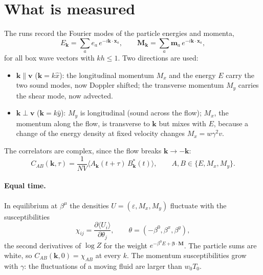 \documentclass[11pt,aps,preprint,nofootinbib,superscriptaddress,tightenlines]{revtex4-2}
\def\st{\begin{equation}}
\def\stp{\end{equation}}
\newcommand{\avg}[1]{\langle #1\rangle}
\let\oldparagraph\paragraph
\renewcommand{\paragraph}{\par\bigskip\oldparagraph}
\begin{document}
\section{What is measured}
\label{sec:measure}

The runs record the Fourier modes of the particle energies and momenta,
\st
E_{\bm k}=\sum_ae_a\,e^{-i\bm k\cdot\bm x_a},\qquad
\bm M_{\bm k}=\sum_a\bm m_a\,e^{-i\bm k\cdot\bm x_a},
\stp
for all box wave vectors with $kh\le1$.  Two directions are used:
\begin{itemize}
\item $\bm k\parallel\bm v$ ($\bm k=k\hat x$): the longitudinal momentum $M_x$ and the energy $E$
  carry the two sound modes, now Doppler shifted; the transverse momentum $M_y$ carries the
  shear mode, now advected.
\item $\bm k\perp\bm v$ ($\bm k=k\hat y$): $M_y$ is longitudinal (sound across the flow); $M_x$,
  the momentum along the flow, is transverse to $\bm k$ but mixes with $E$, because a change of
  the energy density at fixed velocity changes $M_x=w\gamma^2v$.
\end{itemize}
The correlators are complex, since the flow breaks $\bm k\to-\bm k$:
\st
C_{AB}(\bm k,\tau)=\frac{1}{NV}\avg{A_{\bm k}(t+\tau)\,B_{\bm k}^*(t)},\qquad A,B\in\{E,M_x,M_y\}.
\stp

\paragraph{Equal time.}  In equilibrium at $\beta^\mu$ the densities $U=(\varepsilon,M_x,M_y)$
fluctuate with the susceptibilities
\st
\chi_{ij}=\frac{\partial\avg{U_i}}{\partial\theta_j},\qquad
\theta=(-\beta^0,\beta^x,\beta^y),
\label{chi}
\stp
the second derivatives of $\log Z$ for the weight $e^{-\beta^0E+\bm\beta\cdot\bm M}$.  The particle
sums are white, so $C_{AB}(\bm k,0)=\chi_{AB}$ at every $k$.  The momentum susceptibilities grow
with $\gamma$: the fluctuations of a moving fluid are larger than $w_0T_0$.
\end{document}
